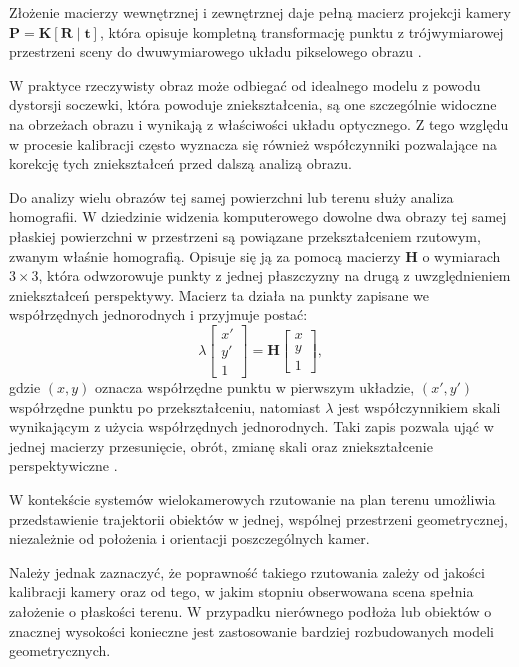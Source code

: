 Złożenie macierzy wewnętrznej i zewnętrznej daje pełną macierz projekcji kamery \(\mathbf{P} =
\mathbf{K}[\mathbf{R} \mid \mathbf{t}]\), która opisuje kompletną transformację punktu z
trójwymiarowej przestrzeni sceny do dwuwymiarowego układu pikselowego obrazu
\cite{hartleyzisserman}.

W praktyce rzeczywisty obraz może odbiegać od idealnego modelu z powodu dystorsji soczewki, która
powoduje zniekształcenia, są one szczególnie widoczne na obrzeżach obrazu i wynikają z właściwości
układu optycznego. Z tego względu w procesie kalibracji często wyznacza się również współczynniki
pozwalające na korekcję tych zniekształceń przed dalszą analizą obrazu\cite{szeliski2022}.

Do analizy wielu obrazów tej samej powierzchni lub terenu służy analiza homografii. W dziedzinie
widzenia komputerowego dowolne dwa obrazy tej samej płaskiej powierzchni w przestrzeni są powiązane
przekształceniem rzutowym, zwanym właśnie homografią. Opisuje się ją za pomocą macierzy
\(\mathbf{H}\) o wymiarach \(3 \times 3\), która odwzorowuje punkty z jednej płaszczyzny na drugą z
uwzględnieniem zniekształceń perspektywy. Macierz ta działa na punkty zapisane we współrzędnych
jednorodnych i przyjmuje postać:
\[
  \lambda
  \begin{bmatrix}
    x' \\
    y' \\
    1
  \end{bmatrix}
  =
  \mathbf{H}
  \begin{bmatrix}
    x \\
    y \\
    1
  \end{bmatrix},
\]
gdzie \((x, y)\) oznacza współrzędne punktu w pierwszym układzie, \((x', y')\) współrzędne punktu
po przekształceniu, natomiast \(\lambda\) jest współczynnikiem skali wynikającym z użycia
współrzędnych jednorodnych. Taki zapis pozwala ująć w jednej macierzy przesunięcie, obrót, zmianę
skali oraz zniekształcenie perspektywiczne \cite{zhang2000, szeliski2022}.

W kontekście systemów wielokamerowych rzutowanie na plan terenu umożliwia przedstawienie
trajektorii obiektów w jednej, wspólnej przestrzeni geometrycznej, niezależnie od położenia i
orientacji poszczególnych kamer.

Należy jednak zaznaczyć, że poprawność takiego rzutowania zależy od jakości kalibracji kamery oraz
od tego, w jakim stopniu obserwowana scena spełnia założenie o płaskości terenu. W przypadku
nierównego podłoża lub obiektów o znacznej wysokości konieczne jest zastosowanie bardziej
rozbudowanych modeli geometrycznych.

